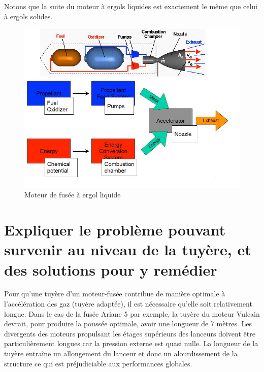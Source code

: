 \documentclass{report}
\begin{document}
Notons que la suite du moteur à ergols liquides est exactement le même que celui à ergols solides.

\begin{figure}[h!]
    \centering
    \includegraphics[scale=0.6]{41.JPG}
    \caption{Moteur de fusée à ergol liquide}
    \label{41}
\end{figure}



\section{Expliquer le problème pouvant survenir au niveau de la tuyère, et des solutions pour y remédier}

Pour qu'une tuyère d'un moteur-fusée contribue de manière optimale à l'accélération des gaz (tuyère adaptée), il est nécessaire qu'elle soit relativement longue. Dans le cas de la fusée Ariane 5 par exemple, la tuyère du moteur Vulcain devrait, pour produire la poussée optimale, avoir une longueur de 7 mètres. Les divergents des moteurs propulsant les étages supérieurs des lanceurs doivent être particulièrement longues car la pression externe est quasi nulle. La longueur de la tuyère entraîne un allongement du lanceur et donc un alourdissement de la structure ce qui est préjudiciable aux performances globales.
\end{document}
